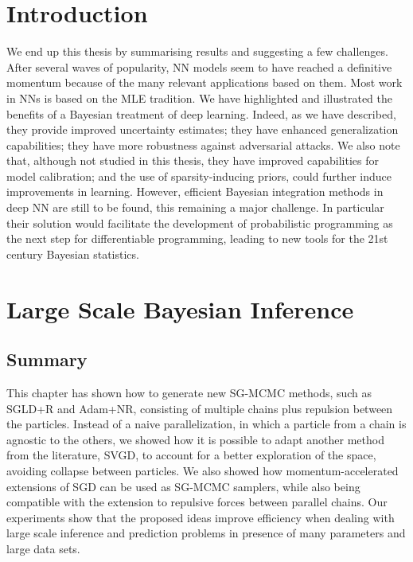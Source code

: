 

\section{Introduction}


We end up this thesis by summarising results and suggesting a few challenges.
After several waves of popularity, NN models seem to 
have reached a definitive momentum because of the many relevant applications
based on them. Most work in NNs is based on the MLE tradition.
We have highlighted and illustrated the benefits of a Bayesian treatment of deep learning. Indeed, as we have described,
they provide improved uncertainty estimates;
they have enhanced generalization capabilities; 
they have more robustness against adversarial attacks.
We also note that, although not studied in this thesis, 
they have improved capabilities for model calibration;
and the use of sparsity-inducing priors, could further induce 
improvements in learning. 
However, efficient Bayesian integration methods in 
deep NN are 
still to be found, this remaining a major challenge.
In particular their solution would facilitate the
development of probabilistic programming \cite{gordon2014probabilistic,carpenter2017stan,wood2014new}
as the next step for differentiable programming,
leading to new tools for the 21st century Bayesian 
statistics.


\section{Large Scale Bayesian Inference}\label{sec:conclusion_lsb}

\subsection{Summary}

This chapter has shown how to generate new SG-MCMC methods, such as SGLD+R and Adam+NR, consisting of multiple chains plus repulsion between the particles. Instead of a naive parallelization, in which a particle from a chain is agnostic to the others, we showed how it is possible to adapt another method from the literature, SVGD, to account for a better exploration of the space, avoiding collapse between particles. We also showed how momentum-accelerated extensions of SGD can be used as SG-MCMC samplers, while also being compatible with the extension to repulsive forces between parallel chains. Our 
experiments show that the proposed ideas improve efficiency when dealing 
with large scale inference and prediction problems in presence of many 
parameters and large data sets.

